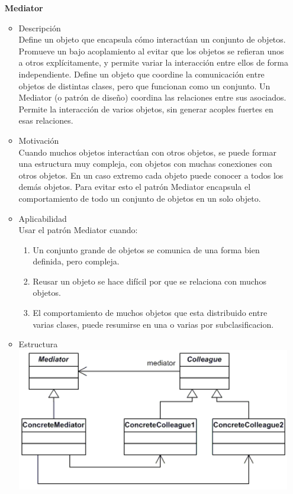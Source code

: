 \documentclass{article}
\begin{document}
\begin{enumerate}
\begin{itemize}
\item[\bf{Mediator}]
\begin{itemize}
\item{Descripción}\\

Define un objeto que encapsula cómo interactúan un conjunto de objetos. Promueve un bajo acoplamiento al evitar que los objetos se refieran unos a otros explícitamente, y permite variar la interacción entre ellos de forma independiente.
Define un objeto que coordine la comunicación entre objetos de distintas clases, pero que funcionan como un conjunto.
Un Mediator (o patrón de diseño) coordina las relaciones entre sus asociados. Permite la interacción de varios objetos, sin generar acoples fuertes en esas relaciones.

\item{Motivación}\\

Cuando muchos objetos interactúan con otros objetos, se puede formar una estructura muy compleja, con objetos con muchas conexiones con otros objetos. En un caso extremo cada objeto puede conocer a todos los demás objetos. Para evitar esto el patrón Mediator encapsula el comportamiento de todo un conjunto de objetos en un solo objeto.

\item{Aplicabilidad}\\

Usar el patrón Mediator cuando:

\begin{enumerate}
\item Un conjunto grande de objetos se comunica de una forma bien definida, pero compleja.
\item Reusar un objeto se hace difícil por que se relaciona con muchos objetos.
\item El comportamiento de muchos objetos que esta distribuido entre varias clases, puede resumirse en una o varias por subclasificacion.
\end{enumerate}

\item{Estructura}\\
\includegraphics[width=12cm]{mediator.png}


\end{itemize} 
\end{itemize}
\end{enumerate}
\end{document}
